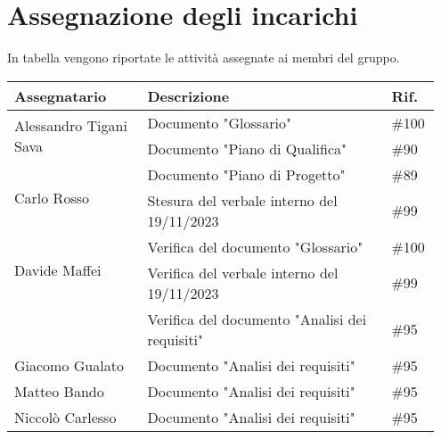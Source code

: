 \section{Assegnazione degli incarichi}
In tabella vengono riportate le attività assegnate ai membri del gruppo.
\begin{center}
	{
		\renewcommand{\arraystretch}{1.5}
		\begin{tabular}{p{0.30\linewidth}|p{0.55\linewidth}|p{0.10\linewidth}}
			\textbf{Assegnatario}                   & \textbf{Descrizione}                           & \textbf{Rif.} \\
			\hline
			\multirow{2}{*}{Alessandro Tigani Sava} & Documento "Glossario"                          & \#100         \\
			\cline{2-3}
			                                        & Documento "Piano di Qualifica"                 & \#90          \\
			\hline
			\multirow{2}{*}{Carlo Rosso}            & Documento "Piano di Progetto"                  & \#89          \\
			\cline{2-3}
			                                        & Stesura del verbale interno del 19/11/2023     & \#99          \\
			\hline
			\multirow{2}{*}{Davide Maffei}          & Verifica del documento "Glossario"             & \#100         \\
			\cline{2-3}
			                                        & Verifica del verbale interno del 19/11/2023    & \#99          \\
			\cline{2-3}
			                                        & Verifica del documento "Analisi dei requisiti" & \#95          \\
			\hline
			Giacomo Gualato                         & Documento "Analisi dei requisiti"              & \#95          \\
			\hline
			Matteo Bando                            & Documento "Analisi dei requisiti"              & \#95          \\
			\hline
			Niccolò Carlesso                        & Documento "Analisi dei requisiti"              & \#95          \\
			\hline
		\end{tabular}
	}
\end{center}
